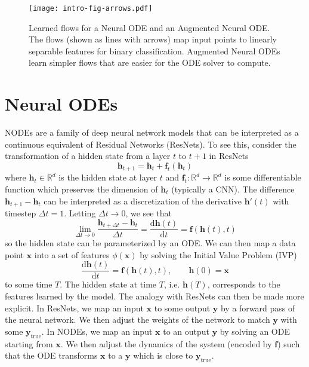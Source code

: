 \documentclass{article}
\begin{document}
\begin{figure}[h]
\begin{center}
\texttt{[image: intro-fig-arrows.pdf]}
\end{center}
\caption{Learned flows for a Neural ODE and an Augmented Neural ODE. The flows (shown as lines with arrows) map input points to linearly separable features for binary classification. Augmented Neural ODEs learn simpler flows that are easier for the ODE solver to compute.}
\label{node-vs-anode-flows}
\end{figure}

\section{Neural ODEs}\label{neural-ode-section}

NODEs are a family of deep neural network models that can be interpreted as a continuous equivalent of Residual Networks (ResNets). To see this, consider the transformation of a hidden state from a layer $t$ to $t+1$ in ResNets
\[ \mathbf{h}_{t+1} = \mathbf{h}_t + \mathbf{f}_t(\mathbf{h}_t) \]
where $\mathbf{h}_t \in \mathbb{R}^d$ is the hidden state at layer $t$ and $\mathbf{f}_t : \mathbb{R}^d \to \mathbb{R}^d$ is some differentiable function which preserves the dimension of $\mathbf{h}_t$ (typically a CNN). The difference $\mathbf{h}_{t+1} - \mathbf{h}_t$ can be interpreted as a discretization of the derivative $\mathbf{h}'(t)$ with timestep $\Delta t = 1$. Letting $\Delta t \to 0$, we see that
\[ \lim_{\Delta t \to 0} \frac{\mathbf{h}_{t+\Delta t} - \mathbf{h}_t}{\Delta t} = \frac{\mathrm{d}\mathbf{h}(t)}{\mathrm{d}t} = \mathbf{f}(\mathbf{h}(t), t) \]
so the hidden state can be parameterized by an ODE. We can then map a data point $\mathbf{x}$ into a set of features $\phi(\mathbf{x})$ by solving the Initial Value Problem (IVP) 
\[ \frac{\mathrm{d}\mathbf{h}(t)}{\mathrm{d}t} = \mathbf{f}(\mathbf{h}(t), t), \qquad  \mathbf{h}(0) = \mathbf{x}\]
to some time $T$. The hidden state at time $T$, i.e. $\mathbf{h}(T)$, corresponds to the features learned by the model. The analogy with ResNets can then be made more explicit. In ResNets, we map an input $\mathbf{x}$ to some output $\mathbf{y}$ by a forward pass of the neural network. We then adjust the weights of the network to match $\mathbf{y}$ with some $\mathbf{y}_{\text{true}}$. In NODEs, we map an input $\mathbf{x}$ to an output $\mathbf{y}$ by solving an ODE starting from $\mathbf{x}$. We then adjust the dynamics of the system (encoded by $\mathbf{f}$) such that the ODE transforms $\mathbf{x}$ to a $\mathbf{y}$ which is close to $\mathbf{y}_{\text{true}}$. 
\end{document}
